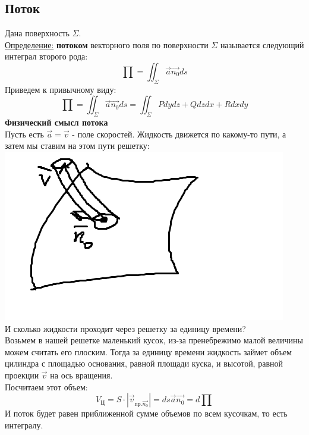 \documentclass[12pt]{article}
\begin{document}
\subsection{Поток}
Дана поверхность $\Sigma$.\\
\uline{Определение:} \textbf{потоком} векторного поля по поверхности $\Sigma$ называется следующий интеграл второго рода:\\
$$\prod = \iint_{\Sigma} \overrightarrow{a} \overrightarrow{n_0} ds$$
Приведем к привычному виду:\\
$$\prod = \iint_{\Sigma} \overrightarrow{a} \overrightarrow{n_0} ds = \iint_{\Sigma} Pdydz + Qdzdx + Rdxdy$$
\textbf{Физический смысл потока}\\
Пусть есть $\overrightarrow{a} = \overrightarrow{v}$ - поле скоростей. Жидкость движется по какому-то пути, а затем мы ставим на этом пути решетку:\\
\includegraphics{currentPhysicDefinition}\\
И сколько жидкости проходит через решетку за единицу времени?\\
Возьмем в нашей решетке маленький кусок, из-за пренебрежимо малой величины можем считать его плоским. Тогда за единицу времени жидкость займет объем цилиндра с площадью основания, равной площади куска, и высотой, равной проекции $\overrightarrow{v}$ на ось вращения.\\
Посчитаем этот объем:\\
$$V_{\text{Ц}} = S \cdot |\overrightarrow{v}_{\text{пр.} \overrightarrow{n_0}}| = ds \overrightarrow{a} \overrightarrow{n_0} = d\prod$$
И поток будет равен приближенной сумме объемов по всем кусочкам, то есть интегралу.\\
\end{document}
